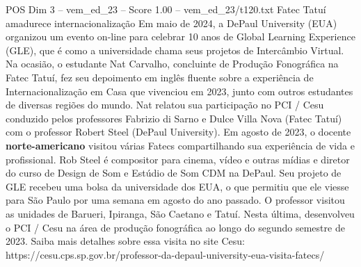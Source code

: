\begin{textsample}{POS Dim 3 – vem\_ed\_23 – Score 1.00 – vem\_ed\_23/t120.txt}  \label{ex:f3_pos_104}
Fatec Tatuí amadurece internacionalização Em maio de 2024, a DePaul University (EUA) organizou um evento on-line para celebrar 10 anos de Global Learning Experience (GLE), que é como a universidade chama seus projetos de Intercâmbio Virtual.
Na ocasião, o estudante Nat Carvalho, concluinte de Produção Fonográfica na Fatec Tatuí, fez seu depoimento em inglês fluente sobre a experiência de Internacionalização em Casa que vivenciou em 2023, junto com outros estudantes de diversas regiões do mundo.
Nat relatou sua participação no PCI / Cesu conduzido pelos professores Fabrizio di Sarno e Dulce Villa Nova (Fatec Tatuí) com o professor Robert Steel (DePaul University).
Em agosto de 2023, o docente \textbf{norte-americano} visitou várias Fatecs compartilhando sua experiência de vida e profissional.
Rob Steel é compositor para cinema, vídeo e outras mídias e diretor do curso de Design de Som e Estúdio de Som CDM na DePaul.
Seu projeto de GLE recebeu uma bolsa da universidade dos EUA, o que permitiu que ele viesse para São Paulo por uma semana em agosto do ano passado.
O professor visitou as unidades de Barueri, Ipiranga, São Caetano e Tatuí.
Nesta última, desenvolveu o PCI / Cesu na área de produção fonográfica ao longo do segundo semestre de 2023.
Saiba mais detalhes sobre essa visita no site Cesu: https://cesu.cps.sp.gov.br/professor-da-depaul-university-eua-visita-fatecs/

\end{textsample}

